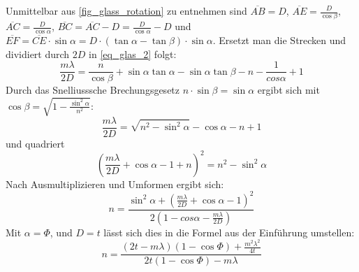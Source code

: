 \documentclass[
	a4paper,
	12pt,
	pagesize,
	ngerman
]{scrartcl}
\begin{document}
	Unmittelbar aus \cref{fig_glass_rotation} zu entnehmen sind
		$\overline{AB} = D$,
		$\overline{AE} = \frac{D}{\cos{\beta}}$,
		$\overline{AC} = \frac{D}{\cos{\alpha}}$,
		$\overline{BC} = \overline{AC} -D = \frac{D}{\cos{\alpha}}-D$ und
		$\overline{EF} = \overline{CE} \cdot \sin{\alpha} = D\cdot (\tan{\alpha}-\tan{\beta})\cdot \sin{\alpha}$.
	Ersetzt man die Strecken und dividiert durch $2D$ in \cref{eq_glas_2} folgt:
	\begin{equation}
		\frac{m\lambda}{2D} = \frac{n}{\cos{\beta}} + \sin{\alpha}\tan{\alpha} - \sin{\alpha}\tan{\beta}-n  - \frac{1}{cos{\alpha}} +1
	\end{equation}
	Durch das Snelliusssche Brechungsgesetz $n \cdot \sin{\beta} = \sin{\alpha}$  ergibt sich mit $\cos{\beta}=\sqrt{1-\frac{\sin^2{\alpha}}{n^2}}$:
	\begin{equation}
		\frac{m\lambda}{2D} = \sqrt{n^2-\sin^2{\alpha}} -\cos{\alpha} - n + 1
	\end{equation}
	und quadriert
	\begin{equation}
		\left(\frac{m\lambda}{2D}+ \cos{\alpha}-1+n\right)^2 = n^2-\sin^2{\alpha}
	\end{equation}
	Nach Ausmultiplizieren und Umformen ergibt sich:
	\begin{equation}
		n=\frac{\sin^2{\alpha}+\left(\frac{m\lambda}{2D} + \cos{\alpha}-1\right)^2}{2(1-cos{\alpha}-\frac{m\lambda}{2D})}
	\end{equation}
	Mit $\alpha=\Phi$, und $D=t$ lässt sich dies in die Formel aus der Einführung umstellen:
	\begin{equation}
		n= \frac{(2t-m\lambda)(1-\cos{\Phi})+ \frac{m^2\lambda^2}{4t}}{2t(1-\cos{\Phi})-m\lambda}
		\label{eq_brechindex}
	\end{equation}
\end{document}
